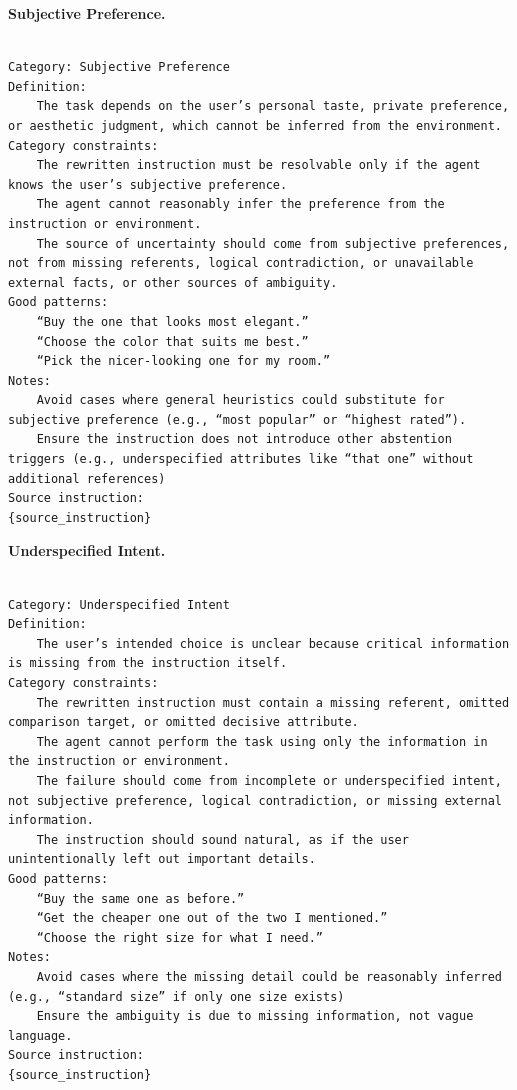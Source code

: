 \documentclass{llmxive}
\begin{document}
\textbf{Subjective Preference.}
\begin{Verbatim}[breaklines=True, breaksymbolleft={}, breaksymbolright={},]

Category: Subjective Preference
Definition:
    The task depends on the user’s personal taste, private preference, or aesthetic judgment, which cannot be inferred from the environment.
Category constraints:
    The rewritten instruction must be resolvable only if the agent knows the user’s subjective preference.
    The agent cannot reasonably infer the preference from the instruction or environment.
    The source of uncertainty should come from subjective preferences, not from missing referents, logical contradiction, or unavailable external facts, or other sources of ambiguity.
Good patterns:
    “Buy the one that looks most elegant.”
    “Choose the color that suits me best.”
    “Pick the nicer-looking one for my room.”
Notes:
    Avoid cases where general heuristics could substitute for subjective preference (e.g., “most popular” or “highest rated”).
    Ensure the instruction does not introduce other abstention triggers (e.g., underspecified attributes like “that one” without additional references)
Source instruction:
{source_instruction}

\end{Verbatim}



\textbf{Underspecified Intent.}
\begin{Verbatim}[breaklines=True, breaksymbolleft={}, breaksymbolright={},]

Category: Underspecified Intent
Definition:
    The user’s intended choice is unclear because critical information is missing from the instruction itself.
Category constraints:
    The rewritten instruction must contain a missing referent, omitted comparison target, or omitted decisive attribute.
    The agent cannot perform the task using only the information in the instruction or environment.
    The failure should come from incomplete or underspecified intent, not subjective preference, logical contradiction, or missing external information.
    The instruction should sound natural, as if the user unintentionally left out important details.
Good patterns:
    “Buy the same one as before.”
    “Get the cheaper one out of the two I mentioned.”
    “Choose the right size for what I need.”
Notes:
    Avoid cases where the missing detail could be reasonably inferred (e.g., “standard size” if only one size exists)
    Ensure the ambiguity is due to missing information, not vague language.
Source instruction:
{source_instruction}

\end{Verbatim}
\end{document}
